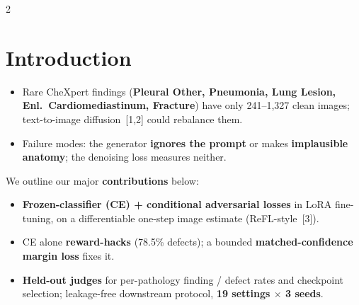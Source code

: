 \documentclass[a0,portrait]{a0poster}
\begin{document}
\begin{minipage}[c]{\linewidth}
\begin{framed}
\begin{multicols}{2}
\section*{Introduction}
\begin{itemize}
	\item Rare CheXpert findings (\textbf{Pleural Other, Pneumonia, Lung Lesion, Enl.\ Cardiomediastinum, Fracture}) have only 241--1{,}327 clean images; text-to-image diffusion~[1,2] could rebalance them.
	\item Failure modes: the generator \textbf{ignores the prompt} or makes \textbf{implausible anatomy}; the denoising loss measures neither.
\end{itemize}
We outline our major \textbf{contributions} below:
\begin{itemize}
	\item \textbf{Frozen-classifier (CE) + conditional adversarial losses} in LoRA fine-tuning, on a differentiable one-step image estimate (ReFL-style~[3]).
	\item CE alone \textbf{reward-hacks} (78.5\% defects); a bounded \textbf{matched-confidence margin loss} fixes it.
	\item \textbf{Held-out judges} for per-pathology finding / defect rates and checkpoint selection; leakage-free downstream protocol, \textbf{19 settings $\times$ 3 seeds}.
\end{itemize}


\end{multicols}
\end{framed}
\end{minipage}
\end{document}
